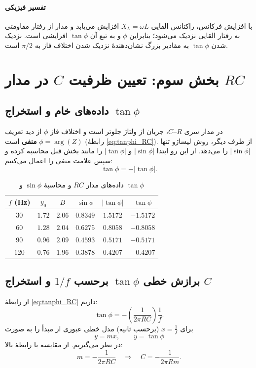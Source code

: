 \documentclass[a4paper, 11pt]{article}
\begin{document}
\paragraph{تفسیر فیزیکی}
با افزایش فرکانس، راکتانس القایی \(X_L=\omega L\) افزایش می‌یابد و مدار از رفتار مقاومتی به رفتار القایی نزدیک می‌شود؛ بنابراین \(\phi\) و به تبع آن \(\tan\phi\) افزایشی است. نزدیک شدن \(\tan\phi\) به مقادیر بزرگ نشان‌دهندهٔ نزدیک شدن اختلاف فاز به \(\pi/2\) است.

\section{بخش سوم: تعیین ظرفیت $C$ در مدار $RC$}

\subsection{داده‌های خام و استخراج \(\tan\phi\)}

در مدار سری \(R\)–\(C\)، جریان از ولتاژ جلوتر است و اختلاف فاز \(\phi\) از دید تعریف \(\phi=\arg(Z)\) \textbf{منفی} است (رابطهٔ \eqref{eq:tanphi_RC}). از طرف دیگر، روش لیساژو تنها \(|\sin\phi|\) را می‌دهد. از این رو ابتدا \(|\sin\phi|\) و \(|\tan\phi|\) را مانند بخش قبل محاسبه کرده و سپس علامت منفی را اعمال می‌کنیم:
\[
\tan\phi = -|\tan\phi|.
\]

\begin{table}[h!]
\caption{داده‌های مدار $RC$ و محاسبهٔ \(\sin\phi\) و \(\tan\phi\)}
\label{tab:RC_raw}
\centering
\begin{tabular}{cccccc}
\toprule
$f$ (Hz) & $y_0$ & $B$ & $\sin\phi$ & $|\tan\phi|$ & $\tan\phi$\\
\midrule
$30$  & $1.72$ & $2.06$ & $0.8349$ & $1.5172$ & $-1.5172$ \\
$60$  & $1.28$ & $2.04$ & $0.6275$ & $0.8058$ & $-0.8058$ \\
$90$  & $0.96$ & $2.09$ & $0.4593$ & $0.5171$ & $-0.5171$ \\
$120$ & $0.76$ & $1.96$ & $0.3878$ & $0.4207$ & $-0.4207$ \\
\bottomrule
\end{tabular}
\end{table}

\subsection{برازش خطی \(\tan\phi\) برحسب \(1/f\) و استخراج \(C\)}

از رابطهٔ \eqref{eq:tanphi_RC} داریم:
\[
\tan\phi = -\left(\frac{1}{2\pi RC}\right)\frac{1}{f}.
\]
برای \(x=\frac{1}{f}\) (برحسب ثانیه) مدل خطی عبوری از مبدأ را به صورت
\[
y = m x,\qquad y=\tan\phi
\]
در نظر می‌گیریم. از مقایسه با رابطهٔ بالا:
\begin{equation}
m = -\frac{1}{2\pi RC}
\quad\Rightarrow\quad
C = -\frac{1}{2\pi R m}.
\label{eq:C_from_m}
\end{equation}
\end{document}
